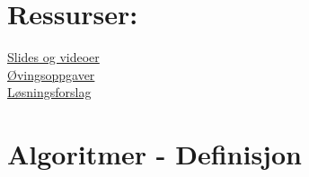 \documentclass[main.tex]{article}
\begin{document}
\section{Ressurser: }
\href{https://hiof.instructure.com/courses/4861/pages/1-dot-1-algoritmeanalyse?module_item_id=101205}{Slides og videoer} \\
\href{https://hiof.instructure.com/courses/4861/pages/1-dot-2-ovingsoppgaver?module_item_id=100963}{Øvingsoppgaver} \\ 
\href{https://hiof.instructure.com/courses/4861/pages/1-dot-3-losningsforslag?module_item_id=100964}{Løsningsforslag} \\

\section{Algoritmer - Definisjon}
\end{document}
